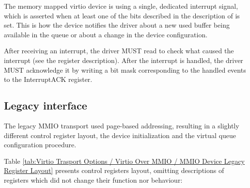The memory mapped virtio device is using a single, dedicated
interrupt signal, which is asserted when at least one of the
bits described in the description of 
is set. This is how the device notifies the
driver about a new used buffer being available in the queue
or about a change in the device configuration.

After receiving an interrupt, the driver MUST read
 to check what caused the interrupt
(see the register description). After the interrupt is handled,
the driver MUST acknowledge it by writing a bit mask
corresponding to the handled events to the InterruptACK register.

\subsection{Legacy interface}\label{sec:Virtio Transport Options / Virtio Over MMIO / Legacy interface}

The legacy MMIO transport used page-based addressing, resulting
in a slightly different control register layout, the device
initialization and the virtual queue configuration procedure.

Table \ref{tab:Virtio Trasport Options / Virtio Over MMIO / MMIO Device Legacy Register Layout} 
presents control registers layout, omitting
descriptions of registers which did not change their function
nor behaviour:

